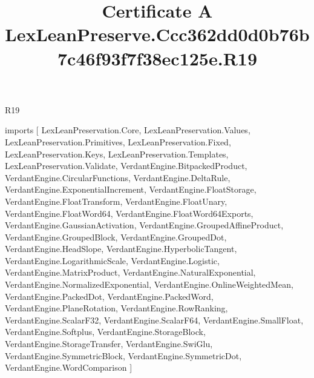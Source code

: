 \begin{lexlean}{R19}
\title{Certificate A LexLeanPreserve.Ccc362dd0d0b76b7c46f93f7f38ec125e.R19}
\begin{coremodule}
imports [
  LexLeanPreservation.Core,
  LexLeanPreservation.Values,
  LexLeanPreservation.Primitives,
  LexLeanPreservation.Fixed,
  LexLeanPreservation.Keys,
  LexLeanPreservation.Templates,
  LexLeanPreservation.Validate,
  VerdantEngine.BitpackedProduct,
  VerdantEngine.CircularFunctions,
  VerdantEngine.DeltaRule,
  VerdantEngine.ExponentialIncrement,
  VerdantEngine.FloatStorage,
  VerdantEngine.FloatTransform,
  VerdantEngine.FloatUnary,
  VerdantEngine.FloatWord64,
  VerdantEngine.FloatWord64Exports,
  VerdantEngine.GaussianActivation,
  VerdantEngine.GroupedAffineProduct,
  VerdantEngine.GroupedBlock,
  VerdantEngine.GroupedDot,
  VerdantEngine.HeadSlope,
  VerdantEngine.HyperbolicTangent,
  VerdantEngine.LogarithmicScale,
  VerdantEngine.Logistic,
  VerdantEngine.MatrixProduct,
  VerdantEngine.NaturalExponential,
  VerdantEngine.NormalizedExponential,
  VerdantEngine.OnlineWeightedMean,
  VerdantEngine.PackedDot,
  VerdantEngine.PackedWord,
  VerdantEngine.PlaneRotation,
  VerdantEngine.RowRanking,
  VerdantEngine.ScalarF32,
  VerdantEngine.ScalarF64,
  VerdantEngine.SmallFloat,
  VerdantEngine.Softplus,
  VerdantEngine.StorageBlock,
  VerdantEngine.StorageTransfer,
  VerdantEngine.SwiGlu,
  VerdantEngine.SymmetricBlock,
  VerdantEngine.SymmetricDot,
  VerdantEngine.WordComparison
]


\end{coremodule}
\end{lexlean}
